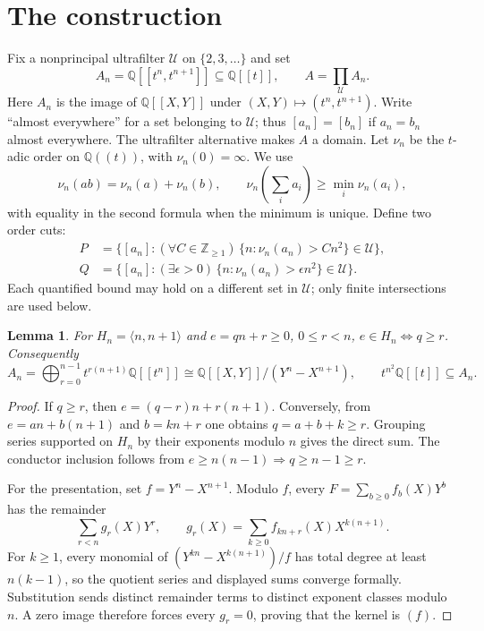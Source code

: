 \documentclass[11pt,reqno]{amsart}
\numberwithin{equation}{section}
\theoremstyle{plain}
\newtheorem{lemma}[theorem]{Lemma}
\newcommand{\QQ}{\mathbb Q}
\newcommand{\UU}{\mathcal U}
\begin{document}
\section{The construction}\label{sec:construction}

Fix a nonprincipal ultrafilter $\UU$ on $\{2,3,\ldots\}$ and set
\[
 A_n=\QQ[[t^n,t^{n+1}]]\subseteq\QQ[[t]],\qquad
 A=\prod_{\UU}A_n.
\]
Here $A_n$ is the image of $\QQ[[X,Y]]$ under
$(X,Y)\mapsto(t^n,t^{n+1})$. Write ``almost everywhere'' for a set
belonging to $\UU$; thus $[a_n]=[b_n]$ if $a_n=b_n$ almost everywhere.
The ultrafilter alternative makes $A$ a domain. Let $\nu_n$ be the
$t$-adic order on $\QQ((t))$, with $\nu_n(0)=\infty$. We use
\[
 \nu_n(ab)=\nu_n(a)+\nu_n(b),\qquad
 \nu_n\!\left(\sum_i a_i\right)\geq\min_i\nu_n(a_i),
\]
with equality in the second formula when the minimum is unique.
Define two order cuts:
\begin{align}
 P&=\bigl\{[a_n]:(\forall C\in\mathbb Z_{\geq1})\,
                  \{n:\nu_n(a_n)>Cn^2\}\in\UU\bigr\},\label{eq:P}\\
 Q&=\bigl\{[a_n]:(\exists\epsilon>0)\,
                  \{n:\nu_n(a_n)>\epsilon n^2\}\in\UU\bigr\}.
                  \label{eq:Q}
\end{align}
Each quantified bound may hold on a different set in $\UU$; only
finite intersections are used below.

\begin{lemma}\label{lem:curves}
For $H_n=\langle n,n+1\rangle$ and $e=qn+r\geq0$, $0\leq r<n$,
$e\in H_n\Longleftrightarrow q\geq r$. Consequently
\begin{equation}\label{eq:curve-facts}
 A_n=\bigoplus_{r=0}^{n-1}t^{r(n+1)}\QQ[[t^n]]
 \cong\QQ[[X,Y]]/(Y^n-X^{n+1}),\qquad
 t^{n^2}\QQ[[t]]\subseteq A_n.
\end{equation}
\end{lemma}
\begin{proof}
If $q\geq r$, then $e=(q-r)n+r(n+1)$. Conversely, from
$e=an+b(n+1)$ and $b=kn+r$ one obtains $q=a+b+k\geq r$.
Grouping series supported on $H_n$ by their exponents modulo $n$
gives the direct sum. The conductor inclusion follows from
$e\geq n(n-1)\Rightarrow q\geq n-1\geq r$.

For the presentation, set $f=Y^n-X^{n+1}$. Modulo $f$, every
$F=\sum_{b\geq0}f_b(X)Y^b$ has the remainder
\[
 \sum_{r<n}g_r(X)Y^r,\qquad
 g_r(X)=\sum_{k\geq0}f_{kn+r}(X)X^{k(n+1)}.
\]
For $k\geq1$, every monomial of $(Y^{kn}-X^{k(n+1)})/f$ has total
degree at least $n(k-1)$, so the quotient series and displayed sums
converge formally. Substitution sends distinct remainder terms to distinct
exponent classes modulo $n$. A zero image therefore forces every
$g_r=0$, proving that the kernel is $(f)$.
\end{proof}
\end{document}
